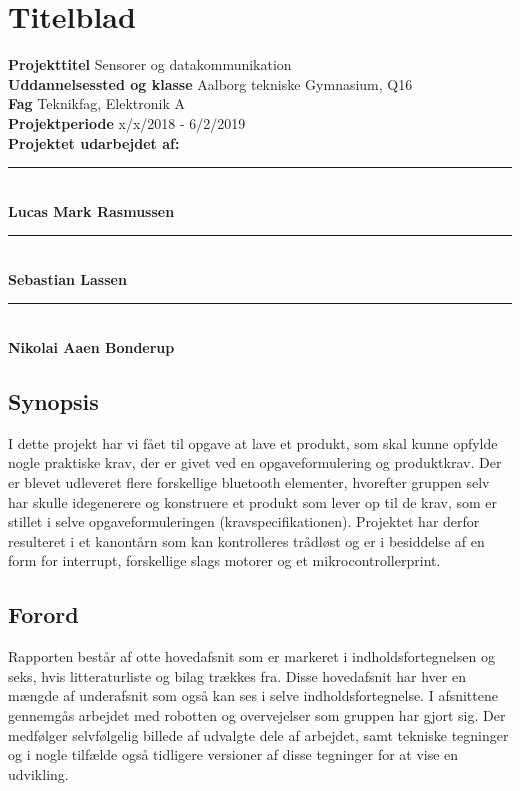 \documentclass[12pt]{article}
\begin{document}


\section*{Titelblad}
{\large \textbf{Projekttitel}} Sensorer og datakommunikation\\[0.5cm]
{\large \textbf{Uddannelsessted og klasse}} Aalborg tekniske Gymnasium, Q16\\[0.5cm]
{\large \textbf{Fag}} Teknikfag, Elektronik A\\[0.5cm]
{\large \textbf{Projektperiode}} x/x/2018 - 6/2/2019\\[0.5cm]
{\large \textbf{Projektet udarbejdet af:}}\\[2cm]

\rule{0.5\textwidth}{0.4pt}\\
\textbf{Lucas Mark Rasmussen} \\[1cm]

\rule{0.5\textwidth}{0.4pt}\\
\textbf{Sebastian Lassen} \\[1cm]

\rule{0.5\textwidth}{0.4pt}\\
\textbf{Nikolai Aaen Bonderup} \\[1cm]

\subsection*{Synopsis}
I dette projekt har vi fået til opgave at lave et produkt, som skal kunne opfylde nogle praktiske krav, der er givet ved en opgaveformulering og produktkrav. Der er blevet udleveret flere forskellige bluetooth elementer, hvorefter gruppen selv har skulle idegenerere og konstruere et produkt som lever op til de krav, som er stillet i selve opgaveformuleringen (kravspecifikationen). Projektet har derfor resulteret i et kanontårn som kan kontrolleres trådløst og er i besiddelse af en form for interrupt, forskellige slags motorer og et mikrocontrollerprint.

\subsection*{Forord}
Rapporten består af otte hovedafsnit som er markeret i indholdsfortegnelsen og seks, hvis litteraturliste og bilag trækkes fra. Disse hovedafsnit har hver en mængde af underafsnit som også kan ses i selve indholdsfortegnelse. I afsnittene gennemgås arbejdet med robotten og overvejelser som gruppen har gjort sig. Der medfølger selvfølgelig billede af udvalgte dele af arbejdet, samt tekniske tegninger og i nogle tilfælde også tidligere versioner af disse tegninger for at vise en udvikling.
\end{document}
